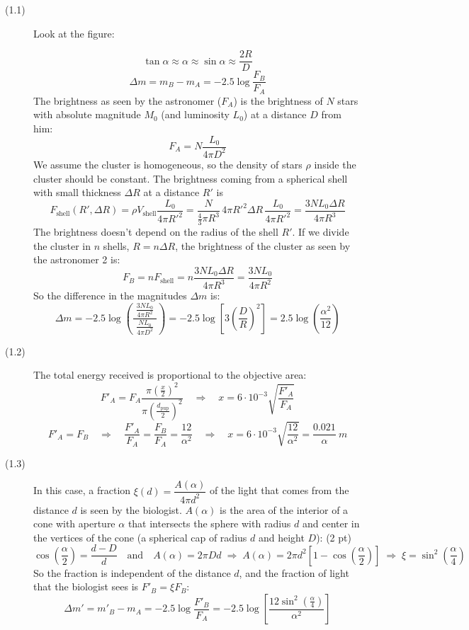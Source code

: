\begin{description}
\item[(1.1)] Look at the figure:

\[
\tan\alpha \approx \alpha \approx \sin\alpha \approx \frac{2R}{D}
\]
\[
\Delta m = m_B - m_A = -2.5 \log\frac{F_B}{F_A}
\]
The brightness as seen by the astronomer ($F_A$) is the brightness of $N$
stars with absolute magnitude $M_0$ (and luminosity $L_0$) at a distance $D$
from him:
\[
F_A = N \frac{L_0}{4\pi D^2} \tag*{(4 pt)}
\]
We assume the cluster is homogeneous, so the density of stars $\rho$ inside
the cluster should be constant. The brightness coming from a spherical shell
with small thickness $\Delta R$ at a distance $R'$ is
\[
F_{\text{shell}}(R', \Delta R)
  = \rho V_{\text{shell}} \frac{L_0}{4\pi R'^2}
  = \frac{N}{\frac{4}{3}\pi R^3}\, 4\pi R'^2 \Delta R\, \frac{L_0}{4\pi R'^2}
  = \frac{3 N L_0 \Delta R}{4\pi R^3} \tag*{(5 pt)}
\]
The brightness doesn't depend on the radius of the shell $R'$. If we divide
the cluster in $n$ shells, $R = n \Delta R$, the brightness of the cluster as
seen by the astronomer 2 is: %
\[
F_B = n F_{\text{shell}} = n \frac{3 N L_0 \Delta R}{4\pi R^3}
    = \frac{3 N L_0}{4\pi R^2} \tag*{(4 pt)}
\]
So the difference in the magnitudes $\Delta m$ is:
\[
\Delta m = -2.5 \log\!\left(\frac{\;\frac{3NL_0}{4\pi R^2}\;}
                                 {\frac{NL_0}{4\pi D^2}}\right)
  = -2.5 \log\!\left[ 3 \left(\frac{D}{R}\right)^{\!2} \right]
  = 2.5 \log\!\left(\frac{\alpha^2}{12}\right) \tag*{(2 pt)}
\]

\item[(1.2)] The total energy received is proportional to the objective area:
\[
F'_A = F_A \frac{\pi \left(\frac{x}{2}\right)^2}
                {\pi \left(\frac{d_{\mathrm{pup}}}{2}\right)^2}
\quad\Rightarrow\quad
x = 6 \cdot 10^{-3} \sqrt{\frac{F'_A}{F_A}} \tag*{(3 pt)}
\]
\[
F'_A = F_B \quad\Rightarrow\quad
\frac{F'_A}{F_A} = \frac{F_B}{F_A} = \frac{12}{\alpha^2}
\quad\Rightarrow\quad
x = 6 \cdot 10^{-3} \sqrt{\frac{12}{\alpha^2}}
  = \frac{0.021}{\alpha}~m \tag*{(3 pt)}
\]

\item[(1.3)] In this case, a fraction
$\xi(d) = \dfrac{A(\alpha)}{4\pi d^2}$ of the light that comes from the
distance $d$ is seen by the biologist. $A(\alpha)$ is the area of the
interior of a cone with aperture $\alpha$ that intersects the sphere with
radius $d$ and center in the vertices of the cone (a spherical cap of radius
$d$ and height $D$): \hfill(2 pt)
\[
\cos\left(\frac{\alpha}{2}\right) = \frac{d - D}{d}
\quad\text{and}\quad
A(\alpha) = 2\pi D d
\;\Rightarrow\;
A(\alpha) = 2\pi d^2 \left[ 1 - \cos\left(\frac{\alpha}{2}\right) \right]
\;\Rightarrow\;
\xi = \sin^2\left(\frac{\alpha}{4}\right) \tag*{(4 pt)}
\]
So the fraction is independent of the distance $d$, and the fraction of light
that the biologist sees is $F'_B = \xi F_B$:
\[
\Delta m' = m'_B - m_A = -2.5 \log\frac{F'_B}{F_A}
  = -2.5 \log\!\left[ \frac{12 \sin^2\left(\frac{\alpha}{4}\right)}{\alpha^2} \right]
\tag*{(3 pt)}
\]
\end{description}

